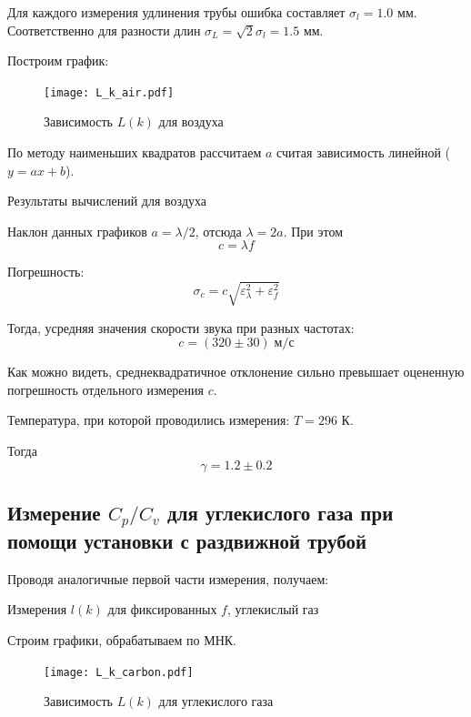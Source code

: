\documentclass[12pt,a4paper]{article}
\begin{document}
		Для каждого измерения удлинения трубы ошибка составляет $\sigma_l = 1.0$ мм.
		Соответственно для разности длин $\sigma_L = \sqrt{2} \sigma_l = 1.5$ мм.
		
		Построим график:
		
		\begin{figure}[H]
			\texttt{[image: L\_k\_air.pdf]}
			\caption{Зависимость $L(k)$ для воздуха}
		\end{figure}
	
		По методу наименьших квадратов рассчитаем $a$ считая зависимость линейной ($y = ax + b$).
	
		\begin{table}[h]
			\caption{Результаты вычислений для воздуха}
			
		\end{table}
		
		Наклон данных графиков $a = \lambda/2$, отсюда $\lambda = 2a$.
		При этом 
			$$c = \lambda f$$
		
		Погрешность:
			$$\sigma_c = c \sqrt{\varepsilon_{\lambda}^2 + \varepsilon_{f}^2}$$
		
		Тогда, усредняя значения скорости звука при разных частотах:
			$$c = (320 \pm 30) \; \text{м/с}$$
			
		Как можно видеть, среднеквадратичное отклонение сильно превышает оцененную погрешность отдельного измерения $c$.
		
		Температура, при которой проводились измерения: $T = 296$ К.
		
		Тогда
			$$\gamma = 1.2 \pm 0.2$$
		
\newpage

		\subsection*{Измерение $ C_p/C_v $ для углекислого газа при помощи установки с раздвижной трубой}
		
		Проводя аналогичные первой части измерения, получаем:
		
		\begin{table}[H]
			\caption{Измерения $l(k)$ для фиксированных $f$, углекислый газ}
			
		\end{table}
		
		Строим графики, обрабатываем по МНК.
		
		\begin{figure}[H]
			\texttt{[image: L\_k\_carbon.pdf]}
			\caption{Зависимость $L(k)$ для углекислого газа}
		\end{figure}
		
\end{document}
